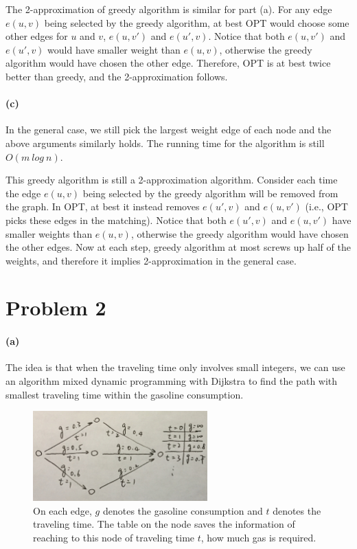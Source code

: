 \documentclass[12pt]{article}
\begin{document}
The 2-approximation of greedy algorithm is similar for part (a). For any edge $e(u, v)$ being selected by the greedy algorithm, at best OPT would choose some other edges for $u$ and $v$, $e(u, v')$ and $e(u', v)$. Notice that both $e(u, v')$ and $e(u', v)$ would have smaller weight than $e(u, v)$, otherwise the greedy algorithm would have chosen the other edge. Therefore, OPT is at best twice better than greedy, and the 2-approximation follows.

\paragraph{(c)} In the general case, we still pick the largest weight edge of each node and the above arguments similarly holds. The running time for the algorithm is still $O(m\:log\:n)$. 

This greedy algorithm is still a 2-approximation algorithm. Consider each time the edge $e(u,v)$ being selected by the greedy algorithm will be removed from the graph. In OPT, at best it instead removes $e(u', v)$ and $e(u, v')$ (i.e., OPT picks these edges in the matching). Notice that both $e(u', v)$ and $e(u, v')$ have smaller weights than $e(u,v)$, otherwise the greedy algorithm would have chosen the other edges. Now at each step, greedy algorithm at most screws up half of the weights, and therefore it implies 2-approximation in the general case.

\pagebreak
\section*{Problem 2}
\paragraph{(a)} The idea is that when the traveling time only involves small integers, we can use an algorithm mixed dynamic programming with Dijkstra to find the path with smallest traveling time within the gasoline consumption. 

\begin{figure}[h!]
	\centering
	\includegraphics[width=0.6\textwidth]{2-1.jpg}
	\caption{\small{On each edge, $g$ denotes the gasoline consumption and $t$ denotes the traveling time. The table on the node saves the information of reaching to this node of traveling time $t$, how much gas is required.}}
	\label{fig:2-1}
\end{figure}
\end{document}
